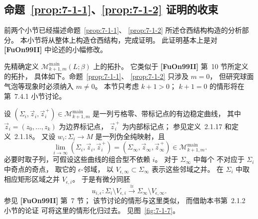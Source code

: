 
\subsection{命题~\ref{prop:7-1-1}、\ref{prop:7-1-2} 证明的收束}
\label{subsec:7-1-4}

前两个小节已经描述命题~\ref{prop:7-1-1}、
\ref{prop:7-1-2} 所述仓西结构构造的分析部分。
本小节将从整体上构造仓西结构，完成证明。
此证明基本上是对 \textbf{[FuOn99II]} 中论述的小幅修改。

先精确定义
$\mathcal M^{\mathrm{main}}_{k+1,m}(L;\beta)$
上的拓扑。
它类似于 \textbf{[FuOn99II]} 第~10 节所定义的拓扑，
具体如下。命题~\ref{prop:7-1-1}、
\ref{prop:7-1-2} 只涉及 $m=0$，
但研究球面气泡等现象时必须纳入 $m\ne0$。
本节只考虑 $k+1>0$；
$k+1=0$ 的情形将在第~7.4.1 小节讨论。

设
$(\Sigma_i,\vec z_i,\vec z_i^{\, +})
\in\mathcal M^{\mathrm{main}}_{k+1,m}$
是一列亏格零、带标记点的有边稳定曲线，
其中
$\vec z_i=(z_0,\ldots,z_k)$
为边界标记点，
$\vec z_i^{\, +}$ 为内部标记点；
参见定义~2.1.17 和定义~2.1.18。
又设 $w_i\colon\Sigma_i\to M$
是一列伪全纯映射，且
\[
\lim_{i\to\infty}
(\Sigma_i,\vec z_i,\vec z_i^{\, +})
=
(\Sigma_\infty,\vec z_\infty,\vec z_\infty^{\, +})
\in\mathcal M^{\mathrm{main}}_{k+1,m}.
\]
必要时取子列，可假设这些曲线的组合型不依赖 $i$。
对于 $\Sigma_\infty$ 中每个
不对应于 $\Sigma_i$ 中奇点的奇点，
取它的 $\epsilon$-邻域，
以 $V_{\epsilon,\infty}\subset\Sigma_\infty$
表示这些邻域之并。
在 $\Sigma_i$ 中取相应矩形区域之并
$V_{\epsilon,i}$。
于是有微分同胚
\[
u_{i,\epsilon}\colon
\Sigma_i\setminus V_{\epsilon,i}
\xrightarrow{\ \cong\ }
\Sigma_\infty\setminus V_{\epsilon,\infty}.
\]
参见 \textbf{[FuOn99II]} 第~7 节；
该节讨论的情形与这里类似，
而借助本书第~2.1.2 小节的论证
可将这里的情形化归过去。
见图~\ref{fig:7-1-7}。

